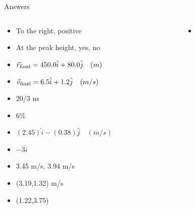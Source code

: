 \documentclass{beamer}
\begin{document}
\begin{frame}{Answers}
\begin{columns}[T]
\begin{column}{0.5\textwidth}
\begin{itemize}
\item To the right, positive
\item At the peak height, yes, no
\item $\vec{r}_{\rm final} = 450.0 \hat{i} + 80.0\hat{j}\quad (m)$
\item $\vec{v}_{\rm final} = 6.5 \hat{i} + 1.2\hat{j}\quad (m/s)$
\item $20/3$ ns
\item 6\%
\item $(2.45)\hat{i}-(0.38)\hat{j} \quad (m/s)$
\item $-3\hat{i}$
\item 3.45 m/s, 3.94 m/s
\item (3.19,1.32) m/s
\item (1.22,3.75)
\end{itemize}
\end{column}
\begin{column}{0.5\textwidth}
\begin{itemize}
\item 
\end{itemize}
\end{column}
\end{columns}
\end{frame}
\end{document}
